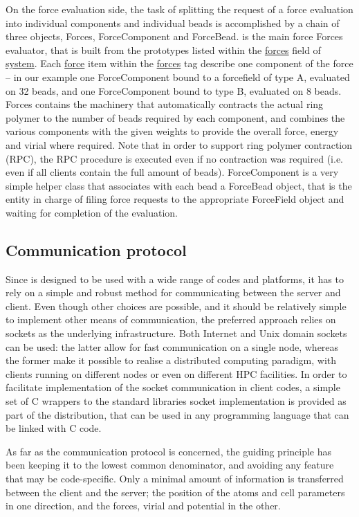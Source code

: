 \documentclass[11pt,english,fleqn]{report}
\begin{document}
On the force evaluation side, the task of splitting the request of a
force evaluation into individual components and individual beads is
accomplished by a chain of three objects, Forces, ForceComponent and ForceBead.
is the main force Forces evaluator, that is built from the prototypes
listed within the \hyperref[FORCES]{forces} field of \hyperref[SYSTEM]{system}.
Each \hyperref[FORCECOMPONENT]{force} item within the
\hyperref[FORCES]{forces} tag describe one component of the force --
in our example one ForceComponent bound to a forcefield of type A,
evaluated on 32 beads, and one ForceComponent bound to type B, evaluated
on 8 beads. Forces contains the machinery that automatically contracts the
actual ring polymer to the number of beads required by each component,
and combines the various components with the given weights to provide the
overall force, energy and virial where required. Note that in order to support
ring polymer contraction (RPC), the RPC procedure is executed even if
no contraction was required (i.e. even if all clients contain the full amount of beads).
ForceComponent is a very simple helper class that associates with each bead
a ForceBead object, that is the entity in charge of filing force requests to
the appropriate ForceField object and waiting for completion of the
evaluation.


\subsection{Communication protocol}

Since \ipi is designed to be used with a wide range of codes and
platforms, it has to rely on a simple and robust method for communicating
between the server and client. Even though other choices are possible,
and it should be relatively simple to implement other means of communication,
the preferred approach relies on sockets as the underlying infrastructure.
Both Internet and Unix domain sockets can be used: the latter allow
for fast communication on a single node, whereas the former make
it possible to realise a distributed computing paradigm, with clients
running on different nodes or even on different HPC facilities. In
order to facilitate implementation of the socket communication in
client codes, a simple set of C wrappers to the standard libraries
socket implementation is provided as part of the \ipi distribution,
that can be used in any programming language that can be linked with
C code.

As far as the communication protocol is concerned, the guiding principle
has been keeping it to the lowest common denominator, and avoiding
any feature that may be code-specific. Only a minimal amount of information
is transferred between the client and the server; the position of
the atoms and cell parameters in one direction, and the forces, virial
and potential in the other.
\end{document}
